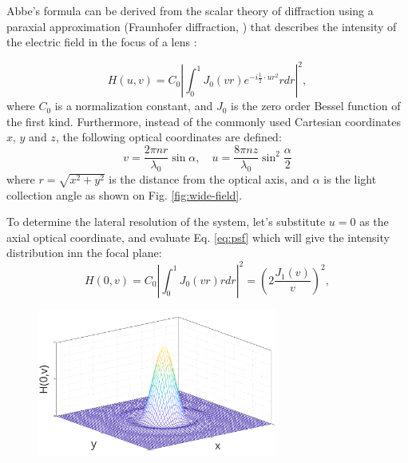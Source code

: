     Abbe's formula can be derived from the scalar theory of diffraction using a paraxial approximation (Fraunhofer diffraction, \cite{born_principles_2013}) that describes the intensity of the electric field in the focus of a lens \cite{sheppard_imaging_1987}:

    \begin{equation}
      H(u,v) = C_0 \left| \int_0^1 J_0 (vr)e^{-i\frac{1}{2}\cdot ur^2} rdr \right|^2,
      \label{eq:psf}
    \end{equation}
    where $C_0$ is a normalization constant, and $J_0$ is the zero order Bessel function of the first kind. Furthermore, instead of the commonly used Cartesian coordinates $x$, $y$ and $z$, the following optical coordinates are defined:
    \begin{equation}
      v = \frac{2\pi n  r}{\lambda_0} \sin \alpha, \quad
      u=\frac{8\pi n  z}{\lambda_0} \sin^2 \frac{\alpha}{2}
      \label{eq:substitutions}
    \end{equation}
    where $r = \sqrt{x^2 + y^2}$ is the distance from the optical axis, and $\alpha$ is the light collection angle as shown on Fig. \ref{fig:wide-field}. 

    To determine the lateral resolution of the system, let's substitute $u=0$ as the axial optical coordinate, and evaluate Eq. \ref{eq:psf} which will give the intensity distribution inn the focal plane:
    \begin{equation}
      H(0,v) = C_0 \left| \int_0^1 J_0(vr)rdr \right|^2 = \left(2\frac{J_1(v)}{v} \right) ^2,
      \label{eq:airy}
    \end{equation}
    \begin{figure}
      \centering
      \includegraphics[width=0.7\textwidth]{airy}
      \label{fig:airy}
    \end{figure}


